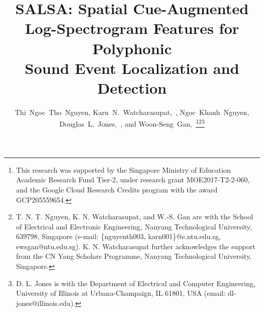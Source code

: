 \documentclass[journal]{IEEEtran}
\begin{document}
\title{SALSA: Spatial Cue-Augmented\\Log-Spectrogram Features for Polyphonic\\Sound Event Localization and Detection}


\author{Thi~Ngoc~Tho~Nguyen,
        Karn~N.~Watcharasupat,~,
        Ngoc~Khanh~Nguyen,
        Douglas~L.~Jones,~,
	    and Woon-Seng~Gan,~\thanks{This research was supported by the Singapore Ministry of Education Academic Research Fund Tier-2, under research grant MOE2017-T2-2-060, and the Google Cloud Research Credits program with the award GCP205559654.}\thanks{T. N. T. Nguyen, K. N. Watcharasupat, and W.-S. Gan are with the School of Electrical and Electronic Engineering, Nanyang Technological University, 639798, Singapore (e-mail: \{nguyenth003, karn001\}@e.ntu.edu.sg, ewsgan@ntu.edu.sg). K. N. Watcharasupat further acknowledges the support from the CN Yang Scholars Programme, Nanyang Technological University, Singapore.}\thanks{D. L. Jones is with the Department of Electrical and Computer Engineering, University of Illinois at Urbana-Champaign, IL 61801, USA (email: dl-jones@illinois.edu).}}



















\maketitle
\end{document}
